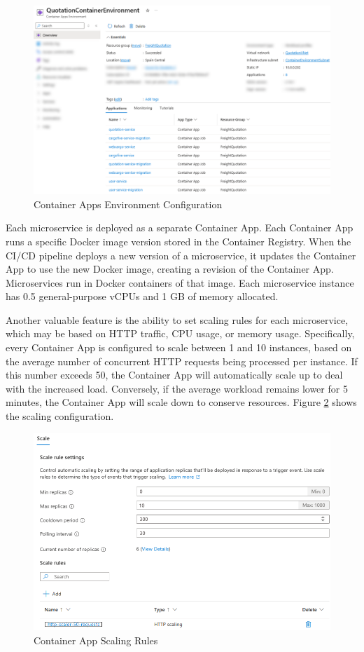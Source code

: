 \documentclass[12pt, reqno, oneside]{amsbook}
\theoremstyle{definition}
\theoremstyle{definition}
\numberwithin{section}{chapter}
\numberwithin{table}{chapter}
\numberwithin{figure}{chapter}
\begin{document}
\begin{figure}[H]
  \centering
  \includegraphics[width=1\linewidth]{images/ContainerAppsEnvironment.png}
  \caption{\label{Figure:ContainerAppsEnvironment}Container Apps Environment Configuration}
\end{figure}

Each microservice is deployed as a separate Container App. Each Container App runs a specific Docker image version stored in the Container Registry. When the \ac{CI/CD} pipeline deploys a new version of a microservice, it updates the Container App to use the new Docker image, creating a revision of the Container App. Microservices run in Docker containers of that image. Each microservice instance has 0.5 general-purpose \acp{vCPU} and 1 \ac{GB} of memory allocated.

Another valuable feature is the ability to set scaling rules for each microservice, which may be based on \ac{HTTP} traffic, \ac{CPU} usage, or memory usage. Specifically, every Container App is configured to scale between 1 and 10 instances, based on the average number of concurrent \ac{HTTP} requests being processed per instance. If this number exceeds 50, the Container App will automatically scale up to deal with the increased load. Conversely, if the average workload remains lower for 5 minutes, the Container App will scale down to conserve resources. Figure \ref{Figure:ContainerAppsScaling} shows the scaling configuration.

\begin{figure}[H]
  \centering
  \includegraphics[width=0.9\linewidth]{images/ContainerAppsScaling.png}
  \caption{\label{Figure:ContainerAppsScaling}Container App Scaling Rules}
\end{figure}
\end{document}
